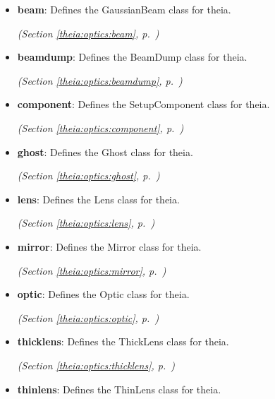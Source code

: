 \begin{itemize}
  \begin{itemize}
\setlength{\parskip}{0ex}
    \item \textbf{beam}: Defines the GaussianBeam class for theia.



  \textit{(Section \ref{theia:optics:beam}, p.~\pageref{theia:optics:beam})}

    \item \textbf{beamdump}: Defines the BeamDump class for theia.



  \textit{(Section \ref{theia:optics:beamdump}, p.~\pageref{theia:optics:beamdump})}

    \item \textbf{component}: Defines the SetupComponent class for theia.



  \textit{(Section \ref{theia:optics:component}, p.~\pageref{theia:optics:component})}

    \item \textbf{ghost}: Defines the Ghost class for theia.



  \textit{(Section \ref{theia:optics:ghost}, p.~\pageref{theia:optics:ghost})}

    \item \textbf{lens}: Defines the Lens class for theia.



  \textit{(Section \ref{theia:optics:lens}, p.~\pageref{theia:optics:lens})}

    \item \textbf{mirror}: Defines the Mirror class for theia.



  \textit{(Section \ref{theia:optics:mirror}, p.~\pageref{theia:optics:mirror})}

    \item \textbf{optic}: Defines the Optic class for theia.



  \textit{(Section \ref{theia:optics:optic}, p.~\pageref{theia:optics:optic})}

    \item \textbf{thicklens}: Defines the ThickLens class for theia.



  \textit{(Section \ref{theia:optics:thicklens}, p.~\pageref{theia:optics:thicklens})}

    \item \textbf{thinlens}: Defines the ThinLens class for theia.




\end{itemize}
\end{itemize}

